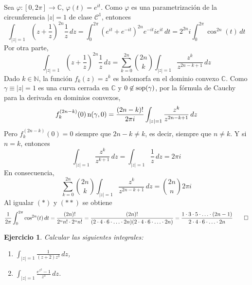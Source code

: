 \documentclass[11pt]{report}
\makeatletter
\renewenvironment{proof}[1][\proofname]{\par
  \pushQED{\qed}%
  \normalfont \topsep\z@skip %
  \trivlist
  \item[\hskip\labelsep
        \itshape
    #1\@addpunct{.}]\ignorespaces
}{%
  \popQED\endtrivlist\@endpefalse
}
\newcommand{\N}{\mathbb N}
\newcommand{\C}{\mathbb C}
\newtheorem{exercise}{Ejercicio}
\makeatother
\begin{document}
\begin{proof}
Sea $\varphi \colon [0,2\pi] \to \C$, $\varphi(t) =e^{it}$. Como $\varphi$ es una parametrización de la circunferencia $|z| = 1$ de clase $\mathcal{C}^1$, entonces
\[\int_{|z| = 1}\left(z+\frac{1}{z}\right)^{2n}\frac{1}{z} \, dz = \int_0^{2\pi}\left(e^{it}+e^{-it}\right)^{2n}e^{-it} i e^{it} \, dt = 2^{2n}i\int_0^{2\pi}\cos^{2n} (t)\, dt \tag{$*$}\]
Por otra parte,
\[\int_{|z| = 1} \left(z+\frac{1}{z}\right)^{2n}\frac{1}{z}\, dz = \sum_{k=0}^{2n}\binom{2n}{k}\int_{|z| = 1}\frac{z^k}{z^{2n-k+1}} \, dz\]
Dado $k \in \N$, la función $f_k(z) = z^k$ es holomorfa en el dominio convexo $\C$. Como $\gamma \equiv |z|=1$ es una curva cerrada en $\C$ y $0 \not\in \textup{sop}(\gamma)$, por la fórmula de Cauchy para la derivada en dominios convexos,
\[f_k^{(2n-k)}(0) \, \textup{n}(\gamma,0) = \frac{(2n-k)!}{2\pi i}\int_{|z|=1} \frac{z^k}{z^{2n-k+1}} \, dz\]
Pero $f^{(2n-k)}_k(0) = 0$ siempre que $2n-k \neq k$, es decir, siempre que $n \neq k$. Y si $n = k$, entonces
\[\int_{|z| = 1} \frac{z^k}{z^{k+1}} \, dz =\int_{|z| = 1} \frac{1}{z} \, dz = 2\pi i\]
En consecuencia,
\[\sum_{k=0}^{2n}\binom{2n}{k}\int_{|z| = 1}\frac{z^k}{z^{2n-k+1}} \, dz = \binom{2n}{n}2\pi i \tag{$**$}\]
Al igualar $(*)$ y $(**)$ se obtiene
\[\frac{1}{2\pi}\int_0^{2\pi} \cos^{2n}(t) \, dt =\frac{(2n)!}{2^nn! \cdot 2^nn!} = \frac{(2n)!}{(2 \cdot 4 \cdot 6 \cdot \mathellipsis \cdot 2n)(2 \cdot 4 \cdot 6 \cdot \mathellipsis \cdot 2n)} = \frac{1\cdot 3 \cdot 5 \cdot \mathellipsis \cdot (2n-1)}{2\cdot 4 \cdot 6 \cdot \mathellipsis \cdot 2n} \qedhere\]
\end{proof}

\begin{exercise}
Calcular las siguientes integrales:
\begin{multicols}{2}
\begin{enumerate}
\centering
    \item $\displaystyle \int_{|z| = 1}\frac{1}{(z+2)z^3} \, dz$,
    \item $\displaystyle \int_{|z| = 1} \frac{e^{z^2}-1}{z^3} \, dz$.
\end{enumerate}
\end{multicols}
\end{exercise}
\end{document}
